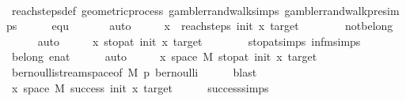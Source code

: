 \begin{isabellebody}
\ \ \ \ \isamarkupfalse%
\ reach{\isacharunderscore}{\kern0pt}steps{\isacharunderscore}{\kern0pt}def\ geometric{\isacharunderscore}{\kern0pt}process\ gambler{\isacharunderscore}{\kern0pt}rand{\isacharunderscore}{\kern0pt}walk{\isachardot}{\kern0pt}simps\ gambler{\isacharunderscore}{\kern0pt}rand{\isacharunderscore}{\kern0pt}walk{\isacharunderscore}{\kern0pt}pre{\isachardot}{\kern0pt}simps{\isacharparenleft}{\kern0pt}{}{\isacharparenright}{\kern0pt}\isanewline
\ \ \ \ \isamarkupfalse%
\ equ\ \isanewline
\ \ \ \ \isamarkupfalse%
\ auto\isanewline
\ \ \isamarkupfalse%
\ \isamarkupfalse%
\ {\isachardoublequoteopen}{\isasymforall}x{\isachardot}{\kern0pt}\ {\isasymSqinter}\ reach{\isacharunderscore}{\kern0pt}steps\ init\ x\ target\ {\isacharequal}{\kern0pt}\ {}{\isachardoublequoteclose}\isanewline
\ \ \ \ \isamarkupfalse%
\ not{\isacharunderscore}{\kern0pt}belong\ \isanewline
\ \ \ \ \isamarkupfalse%
\ auto\isanewline
\ \ \isamarkupfalse%
\ \isamarkupfalse%
\ {\isachardoublequoteopen}{\isasymforall}x{\isachardot}{\kern0pt}\ stop{\isacharunderscore}{\kern0pt}at\ init\ x\ target\ {\isacharequal}{\kern0pt}\ {}{\isachardoublequoteclose}\isanewline
\ \ \ \ \isamarkupfalse%
\ stop{\isacharunderscore}{\kern0pt}at{\isachardot}{\kern0pt}simps\ infm{\isachardot}{\kern0pt}simps\isanewline
\ \ \ \ \isamarkupfalse%
\ belong{\isacharunderscore}{\kern0pt}{}\ enat{\isacharunderscore}{\kern0pt}{}\isanewline
\ \ \ \ \isamarkupfalse%
\ auto\isanewline
\ \ \isamarkupfalse%
\ \isamarkupfalse%
\ {\isachardoublequoteopen}{\isasymforall}x{\isasymin}\ space\ M{\isachardot}{\kern0pt}\ stop{\isacharunderscore}{\kern0pt}at\ init\ x\ target\ {\isacharequal}{\kern0pt}\ {}{\isachardoublequoteclose}\isanewline
\ \ \ \ \isamarkupfalse%
\ bernoulli{\isacharunderscore}{\kern0pt}stream{\isacharunderscore}{\kern0pt}space{\isacharbrackleft}{\kern0pt}of\ M\ p{\isacharbrackright}{\kern0pt}\ bernoulli\isanewline
\ \ \ \ \isamarkupfalse%
\ blast\isanewline
\ \ \isamarkupfalse%
\ \isamarkupfalse%
\ {\isachardoublequoteopen}{\isasymforall}x{\isasymin}\ space\ M{\isachardot}{\kern0pt}\ success\ init\ x\ target{\isachardoublequoteclose}\isanewline
\ \ \ \ \isamarkupfalse%
\ success{\isachardot}{\kern0pt}simps\isanewline

\end{isabellebody}
